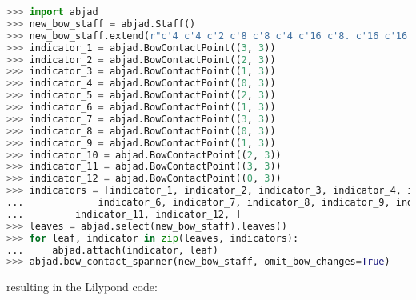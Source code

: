 \singlespace
\begin{lstlisting}[language=Python, caption=Extended bow tablature]
>>> import abjad
>>> new_bow_staff = abjad.Staff()
>>> new_bow_staff.extend(r"c'4 c'4 c'2 c'8 c'8 c'4 c'16 c'8. c'16 c'16 c'16 c'16")
>>> indicator_1 = abjad.BowContactPoint((3, 3))
>>> indicator_2 = abjad.BowContactPoint((2, 3))
>>> indicator_3 = abjad.BowContactPoint((1, 3))
>>> indicator_4 = abjad.BowContactPoint((0, 3))
>>> indicator_5 = abjad.BowContactPoint((2, 3))
>>> indicator_6 = abjad.BowContactPoint((1, 3))
>>> indicator_7 = abjad.BowContactPoint((3, 3))
>>> indicator_8 = abjad.BowContactPoint((0, 3))
>>> indicator_9 = abjad.BowContactPoint((1, 3))
>>> indicator_10 = abjad.BowContactPoint((2, 3))
>>> indicator_11 = abjad.BowContactPoint((3, 3))
>>> indicator_12 = abjad.BowContactPoint((0, 3))
>>> indicators = [indicator_1, indicator_2, indicator_3, indicator_4, indicator_5,
... 			indicator_6, indicator_7, indicator_8, indicator_9, indicator_10,
...			indicator_11, indicator_12, ]
>>> leaves = abjad.select(new_bow_staff).leaves()
>>> for leaf, indicator in zip(leaves, indicators):
...     abjad.attach(indicator, leaf)
>>> abjad.bow_contact_spanner(new_bow_staff, omit_bow_changes=True)
\end{lstlisting}
\doublespace

resulting in the Lilypond code:

